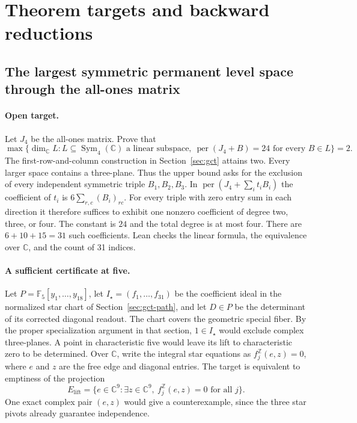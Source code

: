 \section{Theorem targets and backward reductions}
\label{sec:theorem-targets}

\subsection{The largest symmetric permanent level space through the all-ones matrix}
\label{sec:permanent-target}

\paragraph{Open target.}
Let \(J_4\) be the all-ones matrix. Prove that
\[
 \max\{\dim_{\mathbb C}L : L\subseteq\operatorname{Sym}_4(\mathbb C)
   \text{ a linear subspace},\
   \operatorname{per}(J_4+B)=24\text{ for every }B\in L\}=2 .
\]
The first-row-and-column construction in Section~\ref{sec:gct} attains
two. Every larger space contains a three-plane. Thus the upper bound
asks for the exclusion of every independent symmetric triple
\(B_1,B_2,B_3\). In \(\operatorname{per}(J_4+\sum_i t_iB_i)\)
the coefficient of \(t_i\) is \(6\sum_{r,c}(B_i)_{rc}\).
For every triple with zero entry sum in each direction it therefore
suffices to exhibit one nonzero coefficient of degree two, three, or
four. The constant is \(24\) and the total degree is at most four.
There are \(6+10+15=31\) such coefficients. Lean checks the linear
formula, the equivalence over \(\mathbb C\), and the count of 31 indices.

\paragraph{A sufficient certificate at five.}
Let \(P=\mathbb F_5[y_1,\ldots,y_{18}]\), let
\(I_\star=(f_1,\ldots,f_{31})\) be the coefficient ideal in the
normalized star chart of Section~\ref{sec:gct-path}, and let \(D\in P\)
be the determinant of its corrected diagonal readout. The chart covers
the geometric special fiber. By the proper specialization argument in
that section, \(1\in I_\star\) would exclude complex three-planes.
A point in characteristic five would leave its lift to characteristic
zero to be determined. Over \(\mathbb C\), write the integral star
equations as \(f_j^{\mathbb Z}(e,z)=0\), where \(e\) and \(z\) are
the free edge and diagonal entries. The target is equivalent to
emptiness of the projection
\[
 E_{\mathrm{lift}}=\{e\in\mathbb C^9:\exists z\in\mathbb C^9,\
 f_j^{\mathbb Z}(e,z)=0\text{ for all }j\}.
\]
One exact complex pair \((e,z)\) would give a counterexample, since
the three star pivots already guarantee independence.

